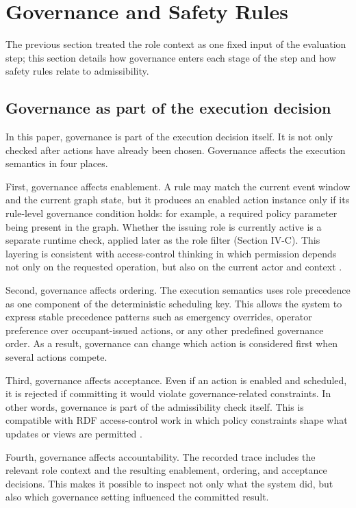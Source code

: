 \documentclass{ieeeaccess}
\theoremstyle{definition}
\theoremstyle{plain}
\theoremstyle{remark}
\begin{document}
\section{Governance and Safety Rules}
\label{sec:governance}

The previous section treated the role context as one fixed input of the evaluation step; this section details how governance enters each stage of the step and how safety rules relate to admissibility.

\subsection{Governance as part of the execution decision}

In this paper, governance is part of the execution decision itself. It is not only checked after actions have already been chosen. Governance affects the execution semantics in four places.

First, governance affects enablement. A rule may match the current event window and the current graph state, but it produces an enabled action instance only if its rule-level governance condition holds: for example, a required policy parameter being present in the graph. Whether the issuing role is currently active is a separate runtime check, applied later as the role filter (Section IV-C). This layering is consistent with access-control thinking in which permission depends not only on the requested operation, but also on the current actor and context \cite{Kirrane2017RDFAccessControlSurvey}.

Second, governance affects ordering. The execution semantics uses role precedence as one component of the deterministic scheduling key. This allows the system to express stable precedence patterns such as emergency overrides, operator preference over occupant-issued actions, or any other predefined governance order. As a result, governance can change which action is considered first when several actions compete.

Third, governance affects acceptance. Even if an action is enabled and scheduled, it is rejected if committing it would violate governance-related constraints. In other words, governance is part of the admissibility check itself. This is compatible with RDF access-control work in which policy constraints shape what updates or views are permitted \cite{Flouris2010AccessRDF,Gabillon2010SPARQLAccessControl}.

Fourth, governance affects accountability. The recorded trace includes the relevant role context and the resulting enablement, ordering, and acceptance decisions. This makes it possible to inspect not only what the system did, but also which governance setting influenced the committed result.
\end{document}
